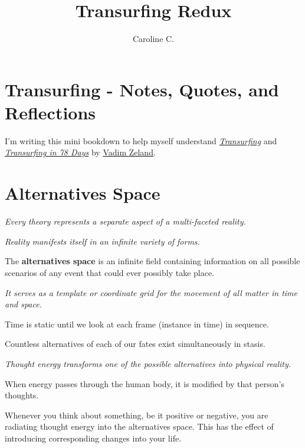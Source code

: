 \documentclass[
  openany]{book}
\title{Transurfing Redux}
\author{Caroline C.}
\date{}
\begin{document}
\maketitle

{
\setcounter{tocdepth}{1}
\tableofcontents
}
\hypertarget{transurfing---notes-quotes-and-reflections}{%
\chapter{Transurfing - Notes, Quotes, and Reflections}\label{transurfing---notes-quotes-and-reflections}}

I'm writing this mini bookdown to help myself understand \href{https://www.amazon.com/Reality-transurfing-Steps-Vadim-Zeland/dp/1532814658}{\emph{Transurfing}} and \href{https://www.amazon.com/Transurfing-78-Days-Practical-Creating/dp/5957334715/ref=pd_lpo_1?pd_rd_i=5957334715\&psc=1}{\emph{Transurfing in 78 Days}} by \href{https://www.amazon.com/Vadim-Zeland/e/B00J0SESMY/ref=dp_byline_cont_pop_book_1}{Vadim Zeland}.

\hypertarget{alternatives-space}{%
\chapter{Alternatives Space}\label{alternatives-space}}

\emph{Every theory represents a separate aspect of a multi-faceted reality.}

\emph{Reality manifests itself in an infinite variety of forms.}

The \textbf{alternatives space} is an infinite field containing information on all possible scenarios of any event that could ever possibly take place.

\emph{It serves as a template or coordinate grid for the movement of all matter in time and space.}

Time is static until we look at each frame (instance in time) in sequence.

Countless alternatives of each of our fates exist simultaneously in stasis.

\emph{Thought energy transforms one of the possible alternatives into physical reality.}

When energy passes through the human body, it is modified by that person's thoughts.

Whenever you think about something, be it positive or negative, you are radiating thought energy into the alternatives space. This has the effect of introducing corresponding changes into your life.
\end{document}
